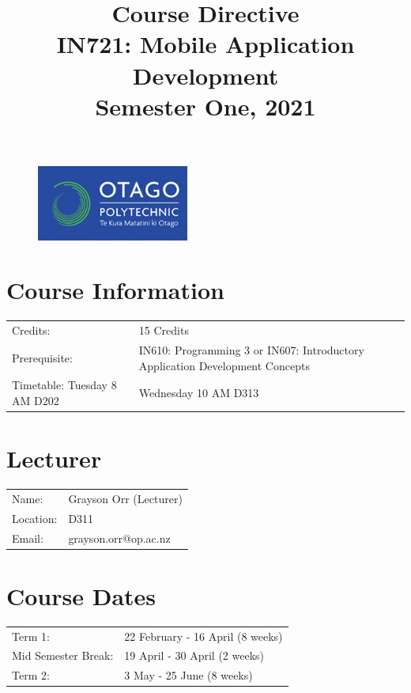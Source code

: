 \documentclass{article}
\author{}
\begin{document}
\begin{figure}
	\includegraphics[width=50mm]{./img/logo.png}
\end{figure}

\title{Course Directive\\IN721: Mobile Application Development\\Semester One, 2021}
\date{}
\maketitle

\section*{Course Information}
\begin{tabular}{ll}
	Credits:                      & 15 Credits                                                                   \\
	Prerequisite:                 & IN610: Programming 3 or IN607: Introductory Application Development Concepts \\
	Timetable:  Tuesday 8 AM D202 & Wednesday 10 AM D313                                                         \\
\end{tabular}

\section*{Lecturer}
\begin{tabular}{ll}
	Name:     & Grayson Orr (Lecturer) \\
	Location: & D311                   \\
	Email:    & grayson.orr@op.ac.nz   \\
\end{tabular}

\section*{Course Dates}
\begin{tabular}{ll}
	Term 1:             & 22 February - 16 April (8 weeks) \\
	Mid Semester Break: & 19 April - 30 April (2 weeks)    \\
	Term 2:             & 3 May - 25 June (8 weeks)        \\                       
\end{tabular}
\end{document}
